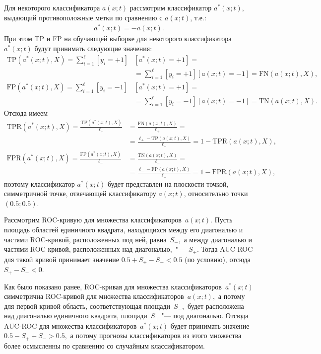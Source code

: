 \documentclass[12pt,a4paper]{article}
\begin{document}
	\begin{esSolution}
		
		Для некоторого классификатора $a(x;t)$ рассмотрим классификатор $a^*(x;t)$, выдающий противоположные метки по сравнению с $a(x;t)$, т.е.:
		\begin{align*}
		a^*(x;t) = -a(x;t).
		\end{align*}
		При этом TP и FP на обучающей выборке для некоторого классификатора $a^*(x;t)$ будут принимать следующие значения:
		\begin{align*}
			\text{TP}(a^*(x; t), X) = 
			\sum_{i=1}^\ell [y_i = +1]&[a^*(x;t) = +1] =\\
			&= \sum_{i=1}^\ell [y_i = +1][a(x;t) = -1] = 
			\text{FN}(a(x; t), X),\\
			\text{FP}(a^*(x; t), X) = 
			\sum_{i=1}^\ell [y_i = -1]&[a^*(x;t) = +1] =\\
			&=\sum_{i=1}^\ell [y_i = -1][a(x;t) = -1] = \text{TN}(a(x; t), X).			
		\end{align*}
		Отсюда имеем
		\begin{align*}
			\text{TPR}(a^*(x;t), X) = 
			\frac{\text{TP}(a^*(x;t), X)}{\ell_+} &= 
			\frac{\text{FN}(a(x;t), X)}{\ell_+} =\\
			&=\frac{\ell_+ - \text{TP}(a(x;t), X)}{\ell_+} 
			= 1 - \text{TPR}(a(x;t), X),\\
			\text{FPR}(a^*(x;t), X) = 
			\frac{\text{FP}(a^*(x;t), X)}{\ell_-} &= 
			\frac{\text{TN}(a(x;t), X)}{\ell_-} =\\
			&=\frac{\ell_- - \text{FP}(a(x;t), X)}{\ell_-} 
			= 1 - \text{FPR}(a(x;t), X),			
		\end{align*}
		поэтому классификатор $a^*(x;t)$ будет представлен на плоскости точкой, симметричной точке, отвечающей классификатору $a(x;t)$, относительно точки~$\left(0.5; 0.5 \right)$. 
		
		Рассмотрим ROC-кривую для множества классификаторов~$a(x;t).$ Пусть площадь областей единичного квадрата, находящихся между его диагональю и частями ROC-кривой, расположенных под ней, равна~$S_-,$ а между диагональю и частями ROC-кривой, расположенных над диагональю,~"---~$S_+.$ Тогда AUC-ROC для такой кривой принимает значение $0.5 + S_+ - S_- < 0.5$ (по условию), отсюда~$S_+ - S_- < 0.$
		
		Как было показано ранее, ROC-кривая для множества классификаторов~$a^*(x;t)$ симметрична ROC-кривой для множества классификаторов~$a(x;t),$ а потому для первой кривой область, соответствующая площади~$S_-,$ будет расположена над диагональю единичного квадрата, площади~$S_+$ "--- под диагональю. Отсюда AUC-ROC для множества классификаторов~$a^*(x;t)$ будет принимать значение $0.5 - S_+ + S_- > 0.5,$ а потому прогнозы классификаторов из этого множества  более осмысленны по сравнению со случайным классификатором.
	\end{esSolution}
	
\end{document}
